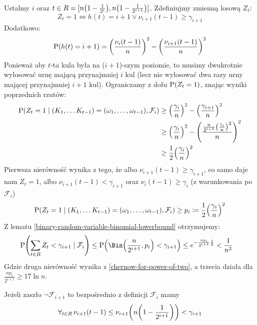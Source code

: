 Ustalmy \(i \) oraz \( t \in R = [n\pars{1 - \frac{1}{2^i}}, n\pars{1 - \frac{1}{2^{i+1}}}] \).
Zdefiniujmy zmienną losową \( Z_t \):
\[
	Z_t = 1 \Leftrightarrow h(t) = i + 1 \lor \nu_{i+1}(t - 1) \geq \gamma_{i+1}
\]
Dodatkowo:
\[
	\prob\pars{h(t) = i + 1} = \pars{\frac{\nu_i(t-1)}{n}}^2 - \pars{\frac{\nu_{i+1}(t-1)}{n}}^2
\]
Ponieważ aby \(t\)-ta kula była na (\(i+1\))-szym poziomie, to musimy dwukrotnie wylosować urnę mającą przynajmniej \(i\) kul (lecz nie wylosować dwa razy urny mającej przynajmniej \(i + 1\) kul).
Ograniczamy z dołu \( \prob\pars{Z_t = 1} \), znając wyniki poprzednich rzutów:
\begin{align*}
	\prob\pars{Z_t = 1 \mid (K_1, \ldots K_{t - 1}) = (\omega_1, \ldots, \omega_{t-1}), \mathcal{F}_i} & \geq \pars{\frac{\gamma_i}{n}}^2 - \pars{\frac{\gamma_{i+1}}{n}}^2                                  \\
	                                                                                                   & \geq \pars{\frac{\gamma_i}{n}}^2 - \pars{\frac{\frac{n}{2^{i+3}} \pars{\frac{\gamma_i}{n}}^2}{n}}^2 \\
	                                                                                                   & \geq \frac{1}{2} \pars{\frac{\gamma_i}{n}}^2
\end{align*}
Pierwsza nierówność wynika z tego, że albo \(\nu_{i+1}(t - 1) \geq \gamma_{i+1}\), co samo daje nam \(Z_t = 1\), albo \(\nu_{i+1}(t - 1) < \gamma_{i+1}\) oraz \( \nu_i(t - 1) \geq \gamma_i \) (z warunkowania po \( \mathcal{F}_i \))
\[
	\prob\pars{Z_t = 1 \mid (K_1, \ldots K_{t - 1}) = (\omega_1, \ldots, \omega_{t-1}), \mathcal{F}_i} \geq p_i \coloneq \frac{1}{2}\pars{\frac{\gamma_i}{n}}^2
\]
Z lematu \ref{binary-random-variable-binomial-lowerbound} otrzymujemy:
\begin{align*}
	\prob\pars{\sum_{t \in R} Z_t < \gamma_{i+1} \mid \mathcal{F}_i } & \leq \prob\pars{\Bin\pars{\frac{n}{2^{i+1}}, p_i} < \gamma_{i+1}} \leq e^{-\frac{np_i}{2^{i+1}}\frac{1}{8}} < \frac{1}{n^2}
\end{align*}
Gdzie druga nierówność wynika z \ref{chernow-for-power-of-two}, a trzecia działa dla \( \frac{np_i}{2^{i+1}} \geq 17\ln n \).

Jeżeli zaszło \( \neg\mathcal{F}_{i+1} \) to bezpośrednio z definicji \( \mathcal{F}_i\) mamy
\[
	\forall_{t \in R} \, \nu_{i+1}(t - 1) \leq \nu_{i+1}\pars{n\pars{1 - \frac{1}{2^{i+1}}}} < \gamma_{i+1}
\]

